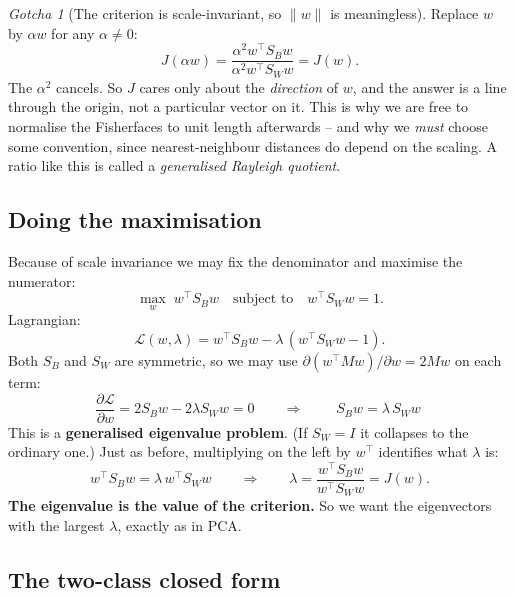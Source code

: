 \documentclass[11pt]{article}
\theoremstyle{definition}
\theoremstyle{remark}
\newtheorem*{gotcha}{Gotcha}
\newcommand{\Sw}{S_W}
\newcommand{\Sb}{S_B}
\begin{document}
\begin{gotcha}[The criterion is scale-invariant, so $\|w\|$ is meaningless]
Replace $w$ by $\alpha w$ for any $\alpha\ne 0$:
\[
  J(\alpha w) = \frac{\alpha^2 w^{\!\top}\Sb w}{\alpha^2 w^{\!\top}\Sw w} = J(w).
\]
The $\alpha^2$ cancels. So $J$ cares only about the \emph{direction} of $w$, and
the answer is a line through the origin, not a particular vector on it. This is why
we are free to normalise the Fisherfaces to unit length afterwards -- and why we
\emph{must} choose some convention, since nearest-neighbour distances do depend on
the scaling. A ratio like this is called a \emph{generalised Rayleigh quotient}.
\end{gotcha}

\subsection{Doing the maximisation}

Because of scale invariance we may fix the denominator and maximise the numerator:
\[
  \max_w\; w^{\!\top}\Sb w \quad\text{subject to}\quad w^{\!\top}\Sw w = 1 .
\]
Lagrangian:
\[
  \mathcal{L}(w,\lambda) = w^{\!\top}\Sb w - \lambda\,(w^{\!\top}\Sw w - 1).
\]
Both $\Sb$ and $\Sw$ are symmetric, so we may use
$\partial(w^{\!\top} Mw)/\partial w = 2Mw$ on each term:
\[
  \frac{\partial\mathcal{L}}{\partial w} = 2\Sb w - 2\lambda \Sw w = 0
  \qquad\Longrightarrow\qquad
  \boxed{\;\Sb w = \lambda\, \Sw w\;}
\]
This is a \textbf{generalised eigenvalue problem}. (If $\Sw=I$ it collapses to the
ordinary one.) Just as before, multiplying on the left by $w^{\!\top}$ identifies what
$\lambda$ is:
\[
  w^{\!\top}\Sb w = \lambda\,w^{\!\top}\Sw w
  \qquad\Longrightarrow\qquad
  \lambda = \frac{w^{\!\top}\Sb w}{w^{\!\top}\Sw w} = J(w).
\]
\textbf{The eigenvalue is the value of the criterion.} So we want the eigenvectors
with the largest $\lambda$, exactly as in PCA.

\subsection{The two-class closed form}\label{sec:twoclass}
\end{document}
